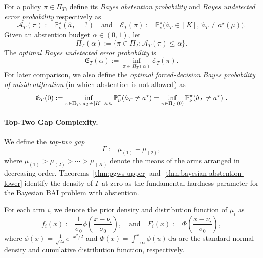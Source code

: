 \documentclass[10pt]{article}
\newcommand{\dd}{\mathrm{d}}
\theoremstyle{plain}
\begin{document}
For a policy $\pi\in\Pi_T$, %
define its {\em Bayes abstention probability} and {\em Bayes undetected error probability} respectively as 
\[
    \mathcal A_T(\pi)
    :=
    \mathbb P_\nu^\pi(\hat a_T=?)
    \quad\mbox{and}\quad
    \mathcal E_T(\pi)
    :=
    \mathbb P_\nu^\pi
    \bigl(\hat a_T\in[K],\ \hat a_T\neq a^\star(\mu)\bigr).
\]
Given an abstention budget $\alpha\in(0,1)$, let
\[
    \Pi_T(\alpha)
    :=
    \{\pi\in\Pi_T:\mathcal A_T(\pi)\le\alpha\}.
\]
The \emph{optimal Bayes undetected error probability} is
\begin{equation}
\label{eq:bayes-risk-abstention}
    \mathfrak E_{T}(\alpha)
    :=
    \inf_{\pi\in\Pi_T(\alpha)}
    \mathcal E_T(\pi).
\end{equation}
For later comparison, we also define the {\em optimal  forced-decision Bayes probability of
misidentification} (in which abstention is not allowed) as 
\begin{equation}
    \mathfrak E_{T}(0)
    :=
    \inf_{\pi\in\Pi_T:\,\hat a_T\in[K]\ {\rm a.s.}}
    \mathbb P_\nu^\pi(\hat a_T\neq a^\star)=  \inf_{\pi\in\Pi_T(0) }
    \mathbb P_\nu^\pi(\hat a_T\neq a^\star)\ . \label{eqn:CT0}
\end{equation}




\paragraph{Top-Two Gap Complexity.}
We define the {\em top-two gap}
\begin{equation}
    \Gamma:=\mu_{(1)}-\mu_{(2)},
\end{equation}
where $\mu_{(1)}>\mu_{(2)}>\cdots>\mu_{(K)}$ denote the  means of the arms arranged in decreasing order. Theorems~\ref{thm:pgws-upper} and~\ref{thm:bayesian-abstention-lower} identify the density of $\Gamma$ at zero as the fundamental hardness parameter for the Bayesian BAI problem with abstention.

For each arm $i$, we denote the prior density and distribution function of $\mu_i$ as
\[
    f_i(x)
    :=
    \frac{1}{\sigma_0}
    \phi\left(\frac{x-\nu_i}{\sigma_0}\right),
    \quad\mbox{and}\quad
    F_i(x)
    :=
    \Phi\left(\frac{x-\nu_i}{\sigma_0}\right),
\]
where $\phi(x)=\frac{1}{\sqrt{2\pi}}e^{-x^2/2}$ and $\Phi(x)=\int_{-\infty}^x \phi(u)\, \dd u$ are the standard normal density and cumulative distribution function, respectively.
\end{document}
